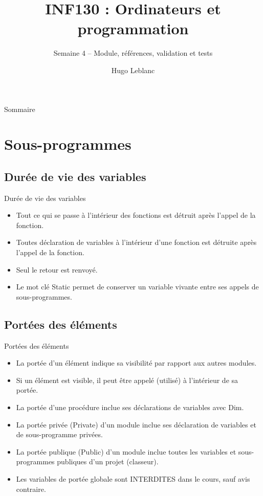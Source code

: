\documentclass[aspectratio=169,usenames,dvipsnames]{beamer}
\title{INF130 : Ordinateurs et programmation}
\subtitle{Semaine 4 – Module, références, validation et tests}
\author{Hugo Leblanc}
\begin{document}
    \maketitle

    \begin{frame}{Sommaire}
        \tableofcontents
    \end{frame}

    \section{Sous-programmes}
    \subsection{Durée de vie des variables}
    \begin{frame}[fragile]{Durée de vie des variables}
        \begin{itemize}
            \item Tout ce qui se passe à l'intérieur des fonctions est détruit après l'appel de la fonction.
            \item Toutes déclaration de variables à l'intérieur d'une fonction est détruite après l'appel de la fonction.
            \item Seul le retour est renvoyé.
            \item Le mot clé \alert{Static} permet de conserver un variable vivante entre ses appels de sous-programmes.
        \end{itemize}
    \end{frame}
    \subsection{Portées des éléments}
    \begin{frame}[t]{Portées des éléments}
        \begin{itemize}
            \item La portée d’un élément indique sa visibilité par rapport aux autres modules.
            \item Si un élément est visible, il peut être appelé (utilisé) à l’intérieur de sa portée.
            \item La portée d’une procédure inclue ses déclarations de variables avec \alert{Dim}.
            \item La portée privée (\alert{Private}) d’un module inclue ses déclaration de variables et de sous-programme privées.
            \item La portée publique (\alert{Public}) d’un module inclue toutes les variables et sous-programmes publiques d’un projet (classeur).
            \item Les variables de portée globale sont \alert{INTERDITES} dans le cours, sauf avis contraire.
        \end{itemize}
    \end{frame}
\end{document}
